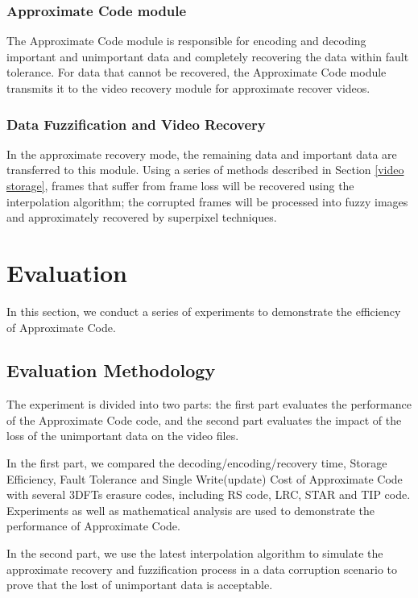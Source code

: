 \documentclass[sigconf]{acmart}
\begin{document}
\subsubsection{Approximate Code module}
The Approximate Code module is responsible for encoding and decoding important and unimportant data and completely recovering the data within fault tolerance. For data that cannot be recovered, the Approximate Code module transmits it to the video recovery module for approximate recover videos.

\subsubsection{Data Fuzzification and Video Recovery}
In the approximate recovery mode, the remaining data and important data are transferred to this module. Using a series of methods described in Section \ref{video storage}, frames that suffer from frame loss will be recovered using the interpolation algorithm; the corrupted frames will be processed into fuzzy images and approximately recovered by superpixel techniques.


\section{Evaluation}\label{evaluation}
In this section, we conduct a series of experiments to demonstrate the efficiency of Approximate Code.
\subsection{Evaluation Methodology}
The experiment is divided into two parts: the first part evaluates the performance of the Approximate Code code, and the second part evaluates the impact of the loss of the unimportant data on the video files.

In the first part, we compared the decoding/encoding/recovery time, Storage Efficiency, Fault Tolerance and Single Write(update) Cost of Approximate Code with several 3DFTs erasure codes, including RS code, LRC, STAR and TIP code. Experiments as well as mathematical analysis are used to demonstrate the performance of Approximate Code.

In the second part, we use the latest interpolation algorithm to simulate the approximate recovery and fuzzification process in a data corruption scenario to prove that the lost of unimportant data is acceptable.
\end{document}
